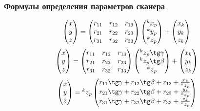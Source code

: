 \documentclass[a4paper, 12pt]{article}
\begin{document}
			\subsubsection{Формулы определения параметров сканера}
				\[
				\begin{pmatrix}
					x\\y\\z
				\end{pmatrix}
				=
				\begin{pmatrix}
					r_{11} & r_{12} & r_{13}\\
					r_{21} & r_{22} & r_{23}\\
					r_{31} & r_{32} & r_{33}
				\end{pmatrix}
				\begin{pmatrix}
					\prescript{k}{}{x}_p\\
					\prescript{k}{}{y}_p\\
					\prescript{k}{}{z}_p
				\end{pmatrix}
				+
				\begin{pmatrix}
					x_k\\y_k\\z_k
				\end{pmatrix}
				\]
				\[
				\begin{pmatrix}
                    x\\y\\z
                \end{pmatrix}
                =
                \begin{pmatrix}
                	r_{11} & r_{12} & r_{13}\\
                	r_{21} & r_{22} & r_{23}\\
                	r_{31} & r_{32} & r_{33}
                \end{pmatrix}
                \begin{pmatrix}
                	\prescript{k}{}{z}_p\tg\gamma\\
                	\prescript{k}{}{z}_p\tg\beta\\
                	\prescript{k}{}{z}_p
                \end{pmatrix}
                +
                \begin{pmatrix}
                	x_k\\y_k\\z_k
                	\end{pmatrix}
                \]
				\[
				\begin{pmatrix}
					x\\y\\z
				\end{pmatrix}
				=
				\prescript{k}{}{z}_p
				\begin{pmatrix}
					r_{11}\tg\gamma + r_{12}\tg\beta + r_{13} + \frac{x_k}{\prescript{k}{}{z}_p}\\
					r_{21}\tg\gamma + r_{22}\tg\beta + r_{23} + \frac{y_k}{\prescript{k}{}{z}_p}\\
					r_{31}\tg\gamma + r_{32}\tg\beta + r_{33} + \frac{z_k}{\prescript{k}{}{z}_p}
				\end{pmatrix}
				\]
\end{document}
